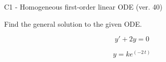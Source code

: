 \begin{exercise}
  \begin{exerciseTitle}C1 - Homogeneous first-order linear ODE (ver. 40)\end{exerciseTitle}
  \begin{exerciseStatement}
    
Find the general solution to the given ODE.

    
\[y'+2y=0\]

  \end{exerciseStatement}
  \begin{exerciseAnswer}
    
\[y= k e^{\left(-2 \, t\right)}\]

  \end{exerciseAnswer}
\end{exercise}